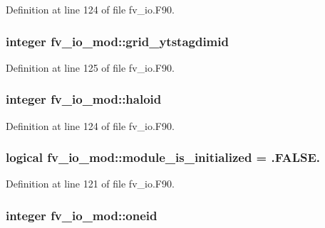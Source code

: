 Definition at line 124 of file fv\-\_\-io.\-F90.

\subsubsection[{grid\-\_\-ytstagdimid}]{\setlength{\rightskip}{0pt plus 5cm}integer fv\-\_\-io\-\_\-mod\-::grid\-\_\-ytstagdimid\hspace{0.3cm}{\ttfamily [private]}}\label{classfv__io__mod_a5b333b9fc08330f0048a52b3d329ac3d}


Definition at line 125 of file fv\-\_\-io.\-F90.

\subsubsection[{haloid}]{\setlength{\rightskip}{0pt plus 5cm}integer fv\-\_\-io\-\_\-mod\-::haloid\hspace{0.3cm}{\ttfamily [private]}}\label{classfv__io__mod_a8dacc1c38af6da8b113fef3ab953e712}


Definition at line 124 of file fv\-\_\-io.\-F90.

\subsubsection[{module\-\_\-is\-\_\-initialized}]{\setlength{\rightskip}{0pt plus 5cm}logical fv\-\_\-io\-\_\-mod\-::module\-\_\-is\-\_\-initialized = .F\-A\-L\-S\-E.\hspace{0.3cm}{\ttfamily [private]}}\label{classfv__io__mod_a0a0d26eb0411470f9d5d7b50a1fc67c7}


Definition at line 121 of file fv\-\_\-io.\-F90.

\subsubsection[{oneid}]{\setlength{\rightskip}{0pt plus 5cm}integer fv\-\_\-io\-\_\-mod\-::oneid\hspace{0.3cm}{\ttfamily [private]}}\label{classfv__io__mod_ac0e83dcce576d02e4f3f6da1c8d5aeb7}


